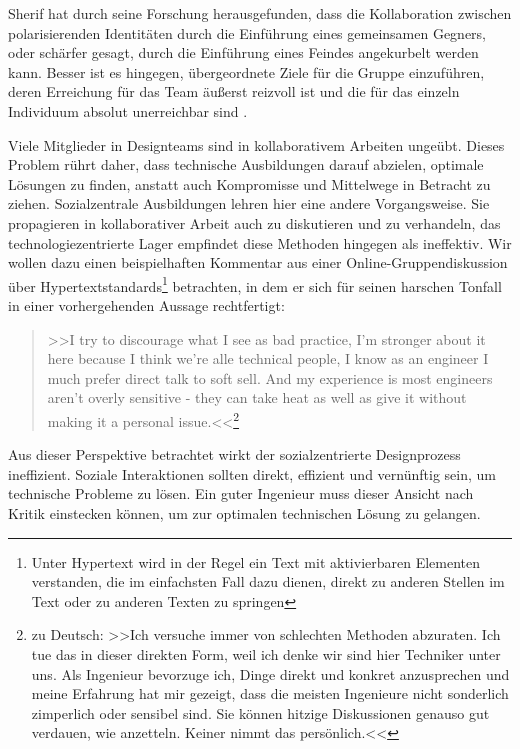 Sherif hat durch seine Forschung herausgefunden, dass die Kollaboration zwischen polarisierenden Identitäten durch die Einführung eines gemeinsamen Gegners, oder schärfer gesagt, durch die Einführung eines Feindes angekurbelt werden kann. Besser ist es hingegen, übergeordnete Ziele für die Gruppe einzuführen, deren Erreichung für das Team äußerst reizvoll ist und die für das einzeln Individuum absolut unerreichbar sind \citep{Sherif:1966}.

Viele Mitglieder in Designteams sind in kollaborativem Arbeiten ungeübt. Dieses Problem rührt daher, dass technische Ausbildungen darauf abzielen, optimale Lösungen zu finden, anstatt auch Kompromisse und Mittelwege in Betracht zu ziehen. Sozialzentrale Ausbildungen lehren hier eine andere Vorgangsweise. Sie propagieren in kollaborativer Arbeit auch zu diskutieren und zu verhandeln, das technologiezentrierte Lager empfindet diese Methoden hingegen als ineffektiv. Wir wollen dazu einen beispielhaften Kommentar aus einer Online-Gruppendiskussion über Hypertextstandards\footnote{Unter Hypertext wird in der Regel ein Text mit aktivierbaren Elementen verstanden, die im einfachsten Fall dazu dienen, direkt zu anderen Stellen im Text oder zu anderen Texten zu springen} betrachten, in dem er sich für seinen harschen Tonfall in einer vorhergehenden Aussage rechtfertigt:

\begin{quote}
	>>I try to discourage what I see as bad practice, I'm stronger about it here because I think we're alle technical people, I know as an engineer I much prefer direct talk to soft sell. And my experience is most engineers aren't overly sensitive - they can take heat as well as give it without making it a personal issue.<<\footnote{zu Deutsch: >>Ich versuche immer von schlechten Methoden abzuraten. Ich tue das in dieser direkten Form, weil ich denke wir sind hier Techniker unter uns. Als Ingenieur bevorzuge ich, Dinge direkt und konkret anzusprechen und meine Erfahrung hat mir gezeigt, dass die meisten Ingenieure nicht sonderlich zimperlich oder sensibel sind. Sie können hitzige Diskussionen genauso gut verdauen, wie anzetteln. Keiner nimmt das persönlich.<<} \\\citep{Kilker:1999}
\end{quote}

Aus dieser Perspektive betrachtet wirkt der sozialzentrierte Designprozess ineffizient. Soziale Interaktionen sollten direkt, effizient und vernünftig sein, um technische Probleme zu lösen. Ein guter Ingenieur muss dieser Ansicht nach Kritik einstecken können, um zur optimalen technischen Lösung zu gelangen. 

